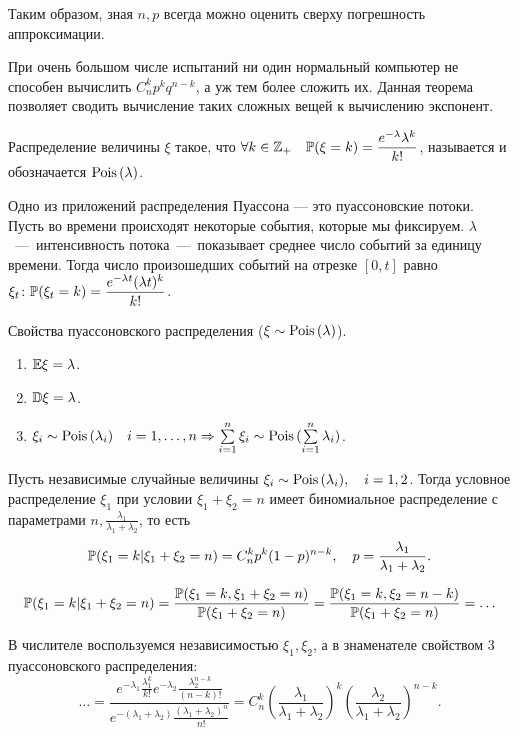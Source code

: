 \documentclass[../TV&MS.tex]{subfiles}
\begin{document}
	Таким образом, зная $n, p$ всегда можно оценить сверху погрешность аппроксимации.
	
	\begin{Why}
	При очень большом числе испытаний ни один нормальный компьютер не способен вычислить  
	$C_n^kp^kq^{n-k}$, а уж тем более сложить их. Данная теорема позволяет сводить вычисление 
	таких сложных вещей к вычислению экспонент.
\end{Why}

\begin{Def}
	Распределение величины $\xi$ такое, что $\forall k \in \mathbb{Z}_+\quad\mathbb{P}(\xi = k)=
	\dfrac{e^{-\lambda}\lambda^k}{k!}$, называется  
	и обозначается ${\rm Pois \,}(\lambda)$.
\end{Def}

	Одно из приложений распределения Пуассона --- это пуассоновские потоки. Пусть во времени 
	происходят некоторые события, которые мы фиксируем. $\lambda$~---~интенсивность 
	потока~---~показывает среднее число событий за единицу времени. Тогда число произошедших 
	событий на отрезке $[0, t]$ равно $\xi_t\colon \mathbb{P}(\xi_t = k) = 
	\dfrac{e^{-\lambda t}(\lambda t)^k}{k!}$.

	Свойства пуассоновского распределения ($\xi \sim {\rm Pois \,}(\lambda)$).
\begin{enumerate}
	\item $\mathbb{E}\xi = \lambda$.
	\item $\mathbb{D}\xi = \lambda$.
	\item $\xi_i \sim {\rm Pois \,}(\lambda_i) \quad i = 1, \ldots, n \Rightarrow 
	\sum\limits_{i = 1}^{n}\xi_i \sim {\rm Pois \,}(\sum\limits_{i = 1}^{n}\lambda_i)$.
\end{enumerate}

\begin{St}
	Пусть независимые случайные величины $\xi_i \sim {\rm Pois \,}(\lambda_i), \quad i = 1, 2$. 
	Тогда условное распределение $\xi_1$ при условии $\xi_1 + \xi_2 = n$ имеет биномиальное 
	распределение с параметрами $n, \frac{\lambda_1}{\lambda_1 + \lambda_2}$, то есть
	$$\mathbb{P}(\xi_1 = k | \xi_1 + \xi_2 = n) = C_n^kp^k(1-p)^{n-k}, 
	\quad p = \frac{\lambda_1}{\lambda_1 + \lambda_2}.$$
\end{St}

\begin{Proof}
    $$\mathbb{P}(\xi_1 = k | \xi_1 + \xi_2 = n) = \frac{\mathbb{P}(\xi_1 = k, \xi_1 + \xi_2 = n)}
    {\mathbb{P}(\xi_1 + \xi_2 = n)} = \frac{\mathbb{P}(\xi_1 = k, \xi_2 = n - k)}{\mathbb{P}(\xi_1 + \xi_2 = n)}=\ldots$$
	
	В числителе воспользуемся независимостью $\xi_1, \xi_2$, а в знаменателе свойством 
	$3$ пуассоновского распределения:
	$$\ldots=\frac{e^{-\lambda_1}\frac{\lambda_1^k}{k!}e^{-\lambda_2}
	\frac{\lambda_2^{n-k}}{(n-k)!}}{e^{-(\lambda_1+\lambda_2)}
	\frac{(\lambda_1+\lambda_2)^n}{n!}} = C_n^k\left(\frac{\lambda_1}{\lambda_1 + \lambda_2}\right)^k
	\left(\frac{\lambda_2}{\lambda_1 + \lambda_2}\right)^{n-k}.$$
\end{Proof}
\end{document}
